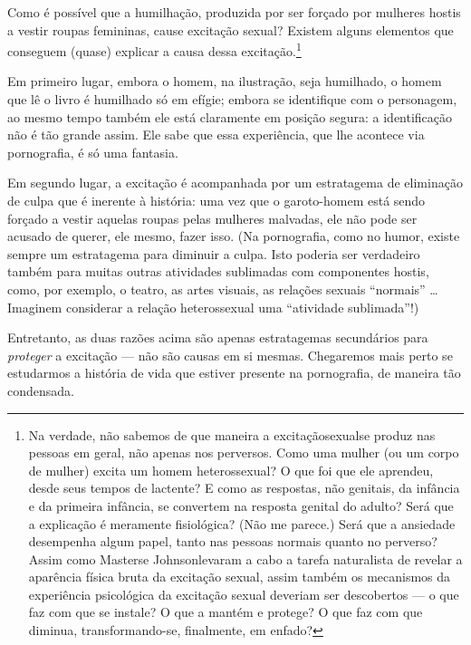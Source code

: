 Como é possível que a humilhação, produzida por ser forçado por
mulheres hostis a vestir roupas femininas, cause\idxsexue{} excitação sexual?\idxpornoexci{}
Existem alguns elementos que conseguem (quase) explicar a causa dessa
excitação.\footnote{ Na verdade, não sabemos de que maneira a
excitação\idxsexue[|nn] sexual\idxpornoexci[|nn] se produz nas pessoas em geral, não apenas nos
perversos. Como uma mulher (ou um corpo de mulher) excita um homem
heterossexual? O que foi que ele aprendeu, desde seus tempos de
lactente? E como as respostas, não genitais, da infância e da
primeira infância, se convertem na resposta genital do adulto? Será que
a explicação é meramente fisiológica? (Não me parece.) Será que a
ansiedade desempenha algum papel, tanto nas pessoas normais quanto no
perverso? Assim como Masters\idxmaste[|nn] e Johnson\idxjohns[|nn] levaram a cabo a tarefa
naturalista de revelar a aparência física bruta da excitação sexual,
assim também os mecanismos da experiência psicológica da excitação
sexual deveriam ser descobertos --- o que faz com que se instale? O
que a mantém e protege? O que faz com que diminua, transformando-se,
finalmente, em enfado?}

Em primeiro lugar, embora o homem, na ilustração, seja humilhado, o
homem que lê o livro é humilhado só em efígie; embora se identifique
com o personagem, ao mesmo tempo também ele está claramente em posição
segura: a identificação não é tão grande assim. Ele sabe que essa
experiência, que lhe acontece via pornografia, é só uma fantasia.\idxtravemhumi[|)]

Em segundo lugar, a excitação é acompanhada por um estratagema de
eliminação de culpa\idxculpar{} que é inerente à história: uma vez que o
garoto-homem está sendo forçado a vestir aquelas roupas pelas mulheres
malvadas, ele não pode ser acusado de querer, ele mesmo, fazer isso.
(Na pornografia, como no humor, existe sempre um estratagema para
diminuir a culpa.\idxpornodisp{} Isto poderia ser verdadeiro também para muitas outras
atividades sublimadas com componentes hostis, como, por exemplo, o
teatro, as artes visuais, as relações sexuais
``normais'' \ldots{} Imaginem considerar a relação
heterossexual uma ``atividade sublimada''!)

Entretanto, as duas razões acima são apenas estratagemas secundários
para \textit{proteger} a excitação --- não são causas em si mesmas.
Chegaremos mais perto se estudarmos a história\idxpornoreal{} de vida que estiver
presente na pornografia, de maneira tão condensada.

